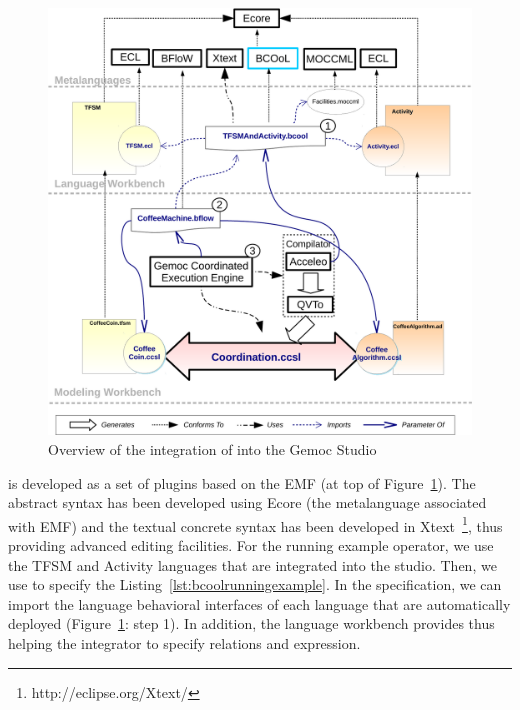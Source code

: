 \begin{figure}[]
	\begin{center}
		\includegraphics[width=1\textwidth]{bcool/figs/bcooltechnos}
		\caption{Overview of the integration of \bcool into the Gemoc Studio}
		\label{fig:bcooltechnos}
	\end{center}
\end{figure}

\bcool is developed as a set of plugins based on the EMF (at top of Figure~\ref{fig:bcooltechnos}). The \bcool abstract syntax has been developed using Ecore (\ie the metalanguage associated with EMF) and the textual concrete syntax has been developed in Xtext~\footnote{http://eclipse.org/Xtext/}, thus providing advanced editing facilities. For the running example operator, we use the TFSM and Activity languages that are integrated into the studio. Then, we use \bcool to specify the Listing~\ref{lst:bcoolrunningexample}. In the \bcool specification, we can import the language behavioral interfaces of each language that are automatically deployed (Figure~\ref{fig:bcooltechnos}: step 1). In addition, the language workbench provides \moccml thus helping the integrator to specify relations and expression.      

